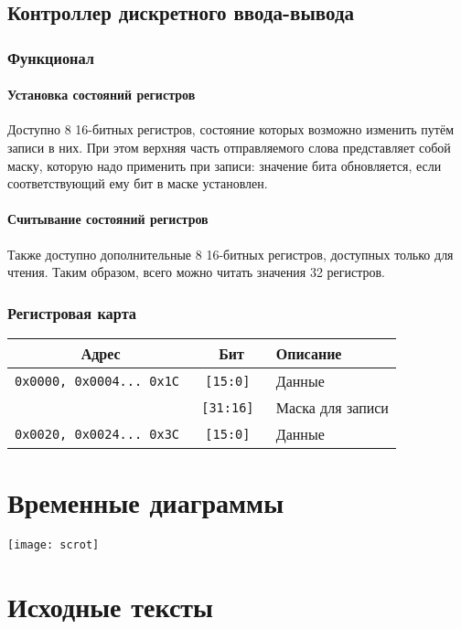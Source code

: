 \documentclass[12pt, a4paper] {ncc}
\begin{document}
\subsection{Контроллер дискретного ввода-вывода}

\subsubsection{Функционал}

\paragraph{Установка состояний регистров} Доступно 8 16-битных регистров,
состояние которых возможно изменить путём записи в них. При этом верхняя часть
отправляемого слова представляет собой маску, которую надо применить при записи:
значение бита обновляется, если соответствующий ему бит в маске установлен.

\paragraph{Считывание состояний регистров} Также доступно дополнительные 8
16-битных регистров, доступных только для чтения. Таким образом, всего можно
читать значения 32 регистров.

\subsubsection{Регистровая карта}

\begin{tabular}{|c|c|l|}
        \hline
        \bf Адрес & \bf Бит & \bf Описание \\
        \hline
        \tt 0x0000, 0x0004... 0x1C & \tt [15:0] & Данные \\
                                   & \tt [31:16] & Маска для записи \\
        \hline
        \tt 0x0020, 0x0024... 0x3C & \tt [15:0] & Данные \\
        \hline
\end{tabular}        

\section{Временные диаграммы}

\texttt{[image: scrot]}

\section{Исходные тексты}






\end{document}
